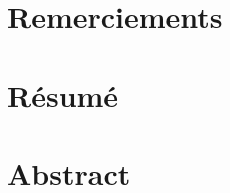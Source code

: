 \documentclass[a4paper,11pt,twoside]{memoir}
\begin{document}
\MakeUGthesePDG

\chapter*{Remerciements}
\chapter*{R\'{e}sum\'{e}}
\chapter*{Abstract}



\dominitoc
\setcounter{tocdepth}{2}
\tableofcontents

\newcommand{\glos}[1]{\gls{#1}*}
\newcommand{\gloss}[1]{\glspl{#1}*}
\newcommand{\Glos}[1]{\Gls{#1}*}
\newcommand{\Gloss}[1]{\Glspl{#1}*}














\glsaddall
\printglossaries



\appendix

\end{document}
